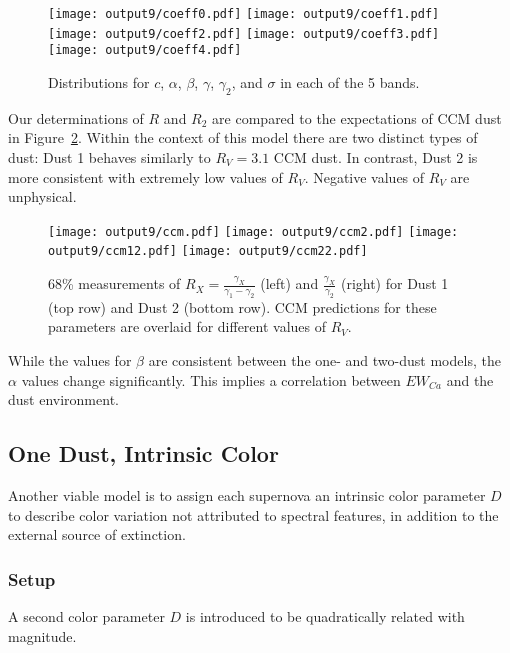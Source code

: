 \documentclass[11pt, oneside]{article}   	%
\begin{document}
\begin{figure}[htbp] %
   \centering
   \texttt{[image: output9/coeff0.pdf]} 
   \texttt{[image: output9/coeff1.pdf]} 
   \texttt{[image: output9/coeff2.pdf]} 
      \texttt{[image: output9/coeff3.pdf]} 
         \texttt{[image: output9/coeff4.pdf]} 
            \caption{Distributions for $c$, $\alpha$, $\beta$, $\gamma$, $\gamma_2$, and $\sigma$ in each of the 5 bands.}
   \label{global2:fig}
\end{figure}

Our determinations of $R$ and $R_2$ are compared to the expectations of CCM dust in Figure~\ref{ccm2:fig}.
Within the context of this model there are two distinct types of dust: Dust 1 behaves similarly to $R_V=3.1$ CCM dust.
In contrast, Dust 2 is more consistent with extremely low values of $R_V$.  Negative values of $R_V$ are unphysical.
\begin{figure}[htbp] %
   \centering
   \texttt{[image: output9/ccm.pdf]}
      \texttt{[image: output9/ccm2.pdf]} 
         \texttt{[image: output9/ccm12.pdf]}
      \texttt{[image: output9/ccm22.pdf]} 
   \caption{68\% measurements of $R_X=\frac{\gamma_X}{\gamma_1-\gamma_2}$ (left) and $\frac{\gamma_X}{\gamma_2}$ (right)
   for Dust 1 (top row) and Dust 2 (bottom row).  CCM
   predictions for these parameters are overlaid for different values of $R_V$.}
   \label{ccm2:fig}
\end{figure}

While the values for $\beta$ are consistent between the one- and two-dust models, the $\alpha$ values change significantly.
This implies a correlation between $EW_{Ca}$ and the dust environment.


\subsection{One Dust, Intrinsic Color}
Another viable model is to assign each supernova an intrinsic color parameter $D$ to describe color variation not attributed to spectral features,
in addition to the external source of extinction.

\subsubsection{Setup}

A second color parameter $D$ is introduced to be quadratically related with magnitude. 
\end{document}

